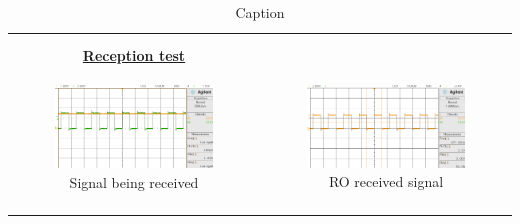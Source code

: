 \begin{table}[H]
\begin{tabular}{|c|c|}
\begin{minipage}[b]{0.45\textwidth}
      \end{minipage}\\
      &\\
      \hline
    \textbf{\underline{{Reception test}}} & \\
    \vspace{-5mm}
    \begin{minipage}[b]{0.45\textwidth}
    \begin{figure}[H]
        \centering
        \includegraphics[width=1\textwidth]{max_recieve_signal.png}
        \vspace{-8mm}
        \caption{\small {Signal being received}}
    \end{figure}
    \end{minipage}
    &
    \begin{minipage}[b]{0.45\textwidth}
    \begin{figure}[H]
        \centering
        \includegraphics[width=1\textwidth]{max_receive_output.png}
        \vspace{-8mm}
        \caption{\small{RO received signal}}
    \end{figure}
    \end{minipage}\\
    &\\
    \hline
    \end{tabular}
    \caption{Caption}
\end{table}
\vspace{-5mm}





